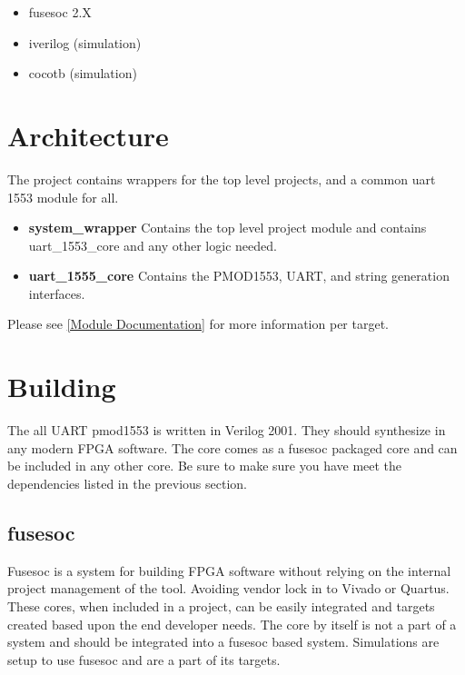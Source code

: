 \begin{itemize}
  \item fusesoc 2.X
  \item iverilog (simulation)
  \item cocotb (simulation)
\end{itemize}



\section{Architecture}
\par
The project contains wrappers for the top level projects, and a common uart 1553 module for all.

\begin{itemize}
  \item \textbf{system\_wrapper} Contains the top level project module and contains uart\_1553\_core and any other logic needed.
  \item \textbf{uart\_1555\_core} Contains the PMOD1553, UART, and string generation interfaces.
\end{itemize}

\par

Please see \ref{Module Documentation} for more information per target.

\section{Building}

\par
The all UART pmod1553 is written in Verilog 2001. They should synthesize in any modern FPGA software. The core comes as a fusesoc packaged core and can be
included in any other core. Be sure to make sure you have meet the dependencies listed in the previous section.

\subsection{fusesoc}
\par
Fusesoc is a system for building FPGA software without relying on the internal project management of the tool. Avoiding vendor lock in to Vivado or Quartus.
These cores, when included in a project, can be easily integrated and targets created based upon the end developer needs. The core by itself is not a part of
a system and should be integrated into a fusesoc based system. Simulations are setup to use fusesoc and are a part of its targets.

